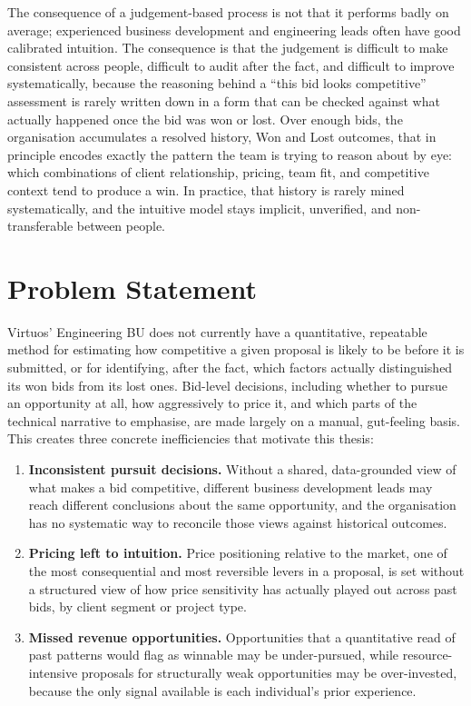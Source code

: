 The consequence of a judgement-based process is not that it performs
badly on average; experienced business development and engineering leads
often have good calibrated intuition. The consequence is that the
judgement is difficult to make consistent across people, difficult to
audit after the fact, and difficult to improve systematically, because
the reasoning behind a ``this bid looks competitive'' assessment is
rarely written down in a form that can be checked against what actually
happened once the bid was won or lost. Over enough bids, the
organisation accumulates a resolved history, Won and Lost outcomes, that
in principle encodes exactly the pattern the team is trying to reason
about by eye: which combinations of client relationship, pricing, team
fit, and competitive context tend to produce a win. In practice, that
history is rarely mined systematically, and the intuitive model stays
implicit, unverified, and non-transferable between people.

\hypertarget{problem-statement}{%
\section{Problem Statement}\label{problem-statement}}

Virtuos' Engineering BU does not currently have a quantitative,
repeatable method for estimating how competitive a given proposal is
likely to be before it is submitted, or for identifying, after the fact,
which factors actually distinguished its won bids from its lost ones.
Bid-level decisions, including whether to pursue an opportunity at all,
how aggressively to price it, and which parts of the technical narrative
to emphasise, are made largely on a manual, gut-feeling basis. This
creates three concrete inefficiencies that motivate this thesis:

\begin{enumerate}
\def\labelenumi{\arabic{enumi}.}
\tightlist
\item
  \textbf{Inconsistent pursuit decisions.} Without a shared,
  data-grounded view of what makes a bid competitive, different business
  development leads may reach different conclusions about the same
  opportunity, and the organisation has no systematic way to reconcile
  those views against historical outcomes.
\item
  \textbf{Pricing left to intuition.} Price positioning relative to the
  market, one of the most consequential and most reversible levers in a
  proposal, is set without a structured view of how price sensitivity
  has actually played out across past bids, by client segment or project
  type.
\item
  \textbf{Missed revenue opportunities.} Opportunities that a
  quantitative read of past patterns would flag as winnable may be
  under-pursued, while resource-intensive proposals for structurally
  weak opportunities may be over-invested, because the only signal
  available is each individual's prior experience.
\end{enumerate}

